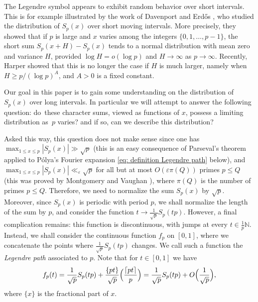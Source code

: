 \documentclass[10pt]{amsart}
\theoremstyle{plain}
\theoremstyle{definition}
\newcommand{\Legendre}[2]{\Bigl(\dfrac{#1}{#2}\Bigr)}
\let\ep\varepsilon
\begin{document}
The Legendre symbol appears to exhibit random behavior over short intervals. This is for example illustrated by the work of Davenport and Erd\H{o}s \cite{DaEr}, who studied the distribution of $S_p(x)$ over short moving intervals. More precisely, they showed that if $p$ is large and $x$ varies among the integers $\{0, 1, \dots, p-1\}$, the short sum $S_p(x+H)-S_p(x)$ tends to a normal distribution with mean zero and variance $H$, provided $\log H = o(\log p)$ and $H \rightarrow \infty$ as $p \rightarrow \infty$. Recently, Harper \cite{Ha3} showed that this is no longer the case if $H$ is much larger, namely when $H\geq p/(\log p)^A$, and $A>0$ is a fixed constant.

Our goal in this paper is to gain some understanding on the distribution of $S_p(x)$ over long intervals. In particular we will attempt to answer the following question: do~these character sums, viewed as functions of $x$, possess a limiting distribution as~$p$ varies? and if so, can we describe this distribution?

Asked this way, this question does not make sense since one has $\max_{1\leq x\leq p}|S_p(x)|\gg\sqrt{p}$ (this is an easy consequence of Parseval's theorem applied to Pólya's Fourier expansion \eqref{eq: definition Legendre path} below), and $\max_{1\leq x\leq p}|S_p(x)|\ll_{\ep} \sqrt{p}$ for all but at most $O(\ep \pi(Q))$ primes $p\leq Q$ (this was proved by Montgomery and Vaughan \cite{MoVa79}), where $\pi(Q)$ is the number of primes $p\leq Q$. Therefore, we need to normalize the sum $S_p(x)$ by $\sqrt{p}$. Moreover, since $S_p(x)$ is periodic with period $p$, we shall normalize the length of the sum by $p$, and consider the function $t\to \frac{1}{\sqrt{p}} S_p(tp)$. However, a final complication remains: this function is discontinuous, with jumps at every $t \in \frac{1}{p}\mathbb{N}$. Instead, we shall consider the continuous function $f_p$ on $[0,1]$, where we concatenate the points where $\frac{1}{\sqrt{p}} S_p(tp)$ changes. We call such a function the \emph{Legendre path} associated to $p$. Note that for $t\in [0,1]$ we have\vspace*{-3pt}\enlargethispage{.5\baselineskip}
\begin{equation}\label{Eq: RelationFpSp}
f_p(t) = \frac{1}{\sqrt{p}}S_p(tp) + \frac{\{ pt \}}{\sqrt{p}} \Legendre{\lceil pt \rceil }{p}= \frac{1}{\sqrt{p}}S_p(tp) + O\Bigl(\frac{1}{\sqrt{p}}\Bigr),
\end{equation}
where $\{x \}$ is the fractional part of $x$.
\end{document}
